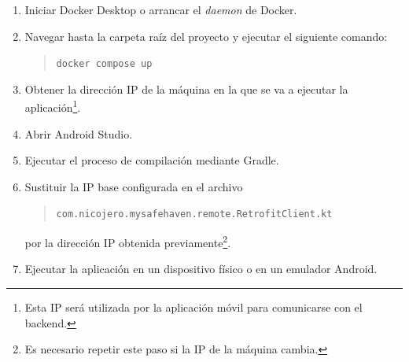 \begin{enumerate}
    \item Iniciar Docker Desktop o arrancar el \textit{daemon} de Docker.
    
    \item Navegar hasta la carpeta raíz del proyecto y ejecutar el siguiente comando:
    \begin{quote}
        \texttt{docker compose up}
    \end{quote}
    
    \item Obtener la dirección IP de la máquina en la que se va a ejecutar la aplicación\footnote{Esta IP será utilizada por la aplicación móvil para comunicarse con el backend.}.
    
    \item Abrir Android Studio.
    
    \item Ejecutar el proceso de compilación mediante Gradle.
    
    \item Sustituir la IP base configurada en el archivo 
    \begin{quote}
        \texttt{com.nicojero.mysafehaven.remote.RetrofitClient.kt} 
    \end{quote}

    por la dirección IP obtenida previamente\footnote{Es necesario repetir este paso si la IP de la máquina cambia.}.
    
    \item Ejecutar la aplicación en un dispositivo físico o en un emulador Android.
\end{enumerate}
